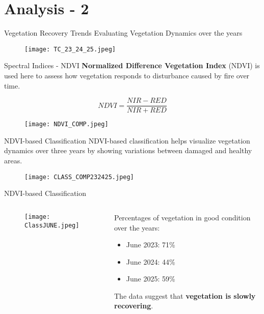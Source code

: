 \documentclass{beamer}
\begin{document}
\section{Analysis - 2} 
\begin{frame}{Vegetation Recovery Trends}
 \bigskip
 \centering Evaluating Vegetation Dynamics over the years 
\begin{figure}
            \texttt{[image: TC\_23\_24\_25.jpeg]}  
            \end{figure}
\end{frame}

\begin{frame}{Spectral Indices - NDVI}
\textbf{Normalized Difference Vegetation Index} (NDVI) is used here to assess how vegetation responds to disturbance caused by fire over time.

\centering 
    \begin{equation*}
        NDVI = \frac{NIR - RED}{NIR + RED}
    \end{equation*}
    \begin{figure}
            \texttt{[image: NDVI\_COMP.jpeg]}  
    \end{figure}
\end{frame}

\begin{frame}{NDVI-based Classification}
\bigskip
NDVI-based classification helps visualize vegetation dynamics over three years by showing variations between damaged and healthy areas. 
\begin{figure}
        \texttt{[image: CLASS\_COMP232425.jpeg]}  
    \end{figure}
\end{frame}

\begin{frame}{NDVI-based Classification}

\begin{columns}

    \begin{column}{0.6\textwidth}
    
        \begin{figure}
        \centering
                \texttt{[image: ClassJUNE.jpeg]}  
        \end{figure}
    \end{column}

    \begin{column}{0.4\textwidth}
    Percentages of vegetation in good condition over the years: \begin{itemize}
            \item June 2023: 71\%
            \item June 2024: 44\%
            \item June 2025: 59\%
        \end{itemize}
        \bigskip
    The data suggest that \textbf{vegetation is slowly recovering}.
    \end{column}

\end{columns}
\end{frame}
\end{document}
